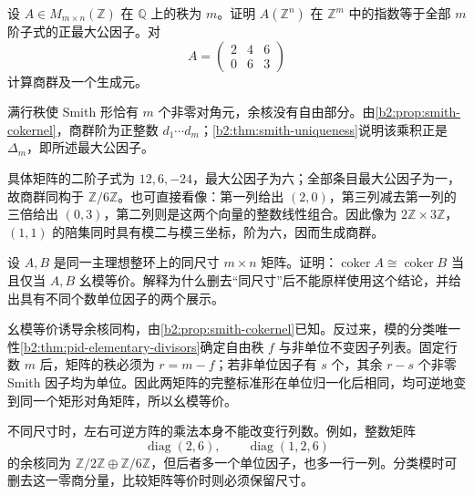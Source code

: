 \begin{exercise}\label{b2:ex:04-maximal-minors-index}
	设 \(A\in M_{m\times n}(\mathbb Z)\) 在 \(\mathbb Q\) 上的秩为 \(m\)。证明 \(A(\mathbb Z^n)\) 在 \(\mathbb Z^m\) 中的指数等于全部 \(m\) 阶子式的正最大公因子。对
	\[
		A=\begin{pmatrix}2&4&6\\0&6&3\end{pmatrix}
	\]
	计算商群及一个生成元。
\end{exercise}
\begin{solution}
	满行秩使 Smith 形恰有 \(m\) 个非零对角元，余核没有自由部分。由\cref{b2:prop:smith-cokernel}，商群阶为正整数 \(d_1\cdots d_m\)；\cref{b2:thm:smith-uniqueness}说明该乘积正是 \(\Delta_m\)，即所述最大公因子。

	具体矩阵的二阶子式为 \(12,6,-24\)，最大公因子为六；全部条目最大公因子为一，故商群同构于 \(\mathbb Z/6\mathbb Z\)。也可直接看像：第一列给出 \((2,0)\)，第三列减去第一列的三倍给出 \((0,3)\)，第二列则是这两个向量的整数线性组合。因此像为 \(2\mathbb Z\times3\mathbb Z\)，\((1,1)\) 的陪集同时具有模二与模三坐标，阶为六，因而生成商群。
\end{solution}

\begin{exercise}\label{b2:ex:04-presentation-size}
	设 \(A,B\) 是同一主理想整环上的同尺寸 \(m\times n\) 矩阵。证明：\(\operatorname{coker}A\cong\operatorname{coker}B\) 当且仅当 \(A,B\) 幺模等价。解释为什么删去“同尺寸”后不能原样使用这个结论，并给出具有不同个数单位因子的两个展示。
\end{exercise}
\begin{solution}
	幺模等价诱导余核同构，由\cref{b2:prop:smith-cokernel}已知。反过来，模的分类唯一性\cref{b2:thm:pid-elementary-divisors}确定自由秩 \(f\) 与非单位不变因子列表。固定行数 \(m\) 后，矩阵的秩必须为 \(r=m-f\)；若非单位因子有 \(s\) 个，其余 \(r-s\) 个非零 Smith 因子均为单位。因此两矩阵的完整标准形在单位归一化后相同，均可逆地变到同一个矩形对角矩阵，所以幺模等价。

	不同尺寸时，左右可逆方阵的乘法本身不能改变行列数。例如，整数矩阵
	\[
		\operatorname{diag}(2,6),\qquad\operatorname{diag}(1,2,6)
	\]
	的余核同为 \(\mathbb Z/2\mathbb Z\oplus\mathbb Z/6\mathbb Z\)，但后者多一个单位因子，也多一行一列。分类模时可删去这一零商分量，比较矩阵等价时则必须保留尺寸。
\end{solution}

